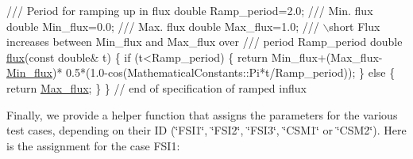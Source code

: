 \begin{DoxyCodeInclude}
 \textcolor{comment}{}
\textcolor{comment}{ /// Period for ramping up in flux}
\textcolor{comment}{} \textcolor{keywordtype}{double} Ramp\_period=2.0;
 \textcolor{comment}{}
\textcolor{comment}{ /// Min. flux }
\textcolor{comment}{} \textcolor{keywordtype}{double} Min\_flux=0.0; 
 \textcolor{comment}{}
\textcolor{comment}{ /// Max. flux}
\textcolor{comment}{} \textcolor{keywordtype}{double} Max\_flux=1.0;
\textcolor{comment}{}
\textcolor{comment}{ /// \(\backslash\)short Flux increases between Min\_flux and Max\_flux over }
\textcolor{comment}{ /// period Ramp\_period}
\textcolor{comment}{} \textcolor{keywordtype}{double} \hyperlink{namespaceGlobal__Parameters_a536aa5314a6cdb36af852e9513351d55}{flux}(\textcolor{keyword}{const} \textcolor{keywordtype}{double}& t)
 \{    
  \textcolor{keywordflow}{if} (t<Ramp\_period)
   \{
    \textcolor{keywordflow}{return} Min\_flux+(Max\_flux-\hyperlink{namespaceGlobal__Parameters_a5aabde2d31d07e5d0a84f6ff02c263dc}{Min\_flux})*
     0.5*(1.0-cos(MathematicalConstants::Pi*t/Ramp\_period));
   \}
  \textcolor{keywordflow}{else}
   \{
    \textcolor{keywordflow}{return} \hyperlink{namespaceGlobal__Parameters_a13f0d5d16393d21bbc904aea5cff4ea4}{Max\_flux};
   \}
 \} \textcolor{comment}{// end of specification of ramped influx}

\end{DoxyCodeInclude}


Finally, we provide a helper function that assigns the parameters for the various test cases, depending on their ID (\char`\"{}\+F\+S\+I1\char`\"{}, \char`\"{}\+F\+S\+I2\char`\"{}, \char`\"{}\+F\+S\+I3\char`\"{}, \char`\"{}\+C\+S\+M1\char`\"{} or \char`\"{}\+C\+S\+M2\char`\"{}). Here is the assignment for the case F\+S\+I1\+:


